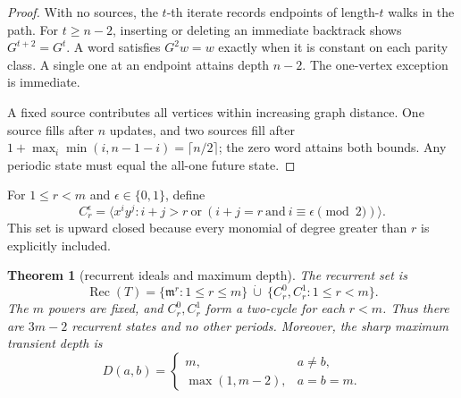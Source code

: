 \documentclass[10pt,a4paper]{amsart}
\newtheorem{theorem}{Theorem}[section]
\theoremstyle{definition}
\theoremstyle{remark}
\newcommand{\Rec}{\operatorname{Rec}}
\newcommand{\mm}{\mathfrak m}
\begin{document}
\begin{proof}
With no sources, the \(t\)-th iterate records endpoints of length-\(t\)
walks in the path.  For \(t\geq n-2\), inserting or deleting an immediate
backtrack shows \(G^{t+2}=G^t\).  A word satisfies \(G^2w=w\) exactly when
it is constant on each parity class.  A single one at an endpoint attains
depth \(n-2\).  The one-vertex exception is immediate.

A fixed source contributes all vertices within increasing graph distance.
One source fills after \(n\) updates, and two sources fill after
\(1+\max_i\min(i,n-1-i)=\lceil n/2\rceil\); the zero word attains both
bounds.  Any periodic state must equal the all-one future state.
\end{proof}

For \(1\leq r<m\) and \(\epsilon\in\{0,1\}\), define
\[
C_r^\epsilon=
\bigl\langle x^iy^j:i+j>r\ \text{or}\
(i+j=r\ \text{and}\ i\equiv\epsilon\!\!\pmod2)\bigr\rangle. \tag{3.1}
\]
This set is upward closed because every monomial of degree greater than
\(r\) is explicitly included.

\begin{theorem}[recurrent ideals and maximum depth]\label{thm:support}
The recurrent set is
\[
\Rec(T)=
\{\mm^r:1\leq r\leq m\}\ \dot\cup\
\{C_r^0,C_r^1:1\leq r<m\}.                               \tag{3.2}\label{eq:rec}
\]
The \(m\) powers are fixed, and \(C_r^0,C_r^1\) form a two-cycle for each
\(r<m\).  Thus there are \(3m-2\) recurrent states and no other periods.
Moreover, the sharp maximum transient depth is
\[
D(a,b)=
\begin{cases}
m,&a\ne b,\\
\max(1,m-2),&a=b=m.
\end{cases}                                               \tag{3.3}\label{eq:depth}
\]
\end{theorem}
\end{document}
